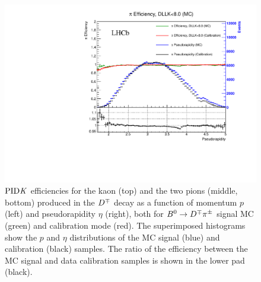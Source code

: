\begin{figure}[t]
\begin{center}
    \includegraphics[width=0.495\linewidth]{AA-Appdx-pid/figs/Bd2DPi_Pi2fromD_DLLKlt8_PIDeff_beforeResampling_ETA.pdf}
  \end{center}
  \vspace{-2mm}
  \caption{$\rm{PID}\it{K}$ efficiencies for the kaon (top) and the two pions (middle, bottom) produced in the $D^\mp$ decay as a function of momentum $p$
	(left) and pseudorapidity $\eta$ (right), both for $B^0\rightarrow D^\mp\pi^\pm$ signal MC (green) and calibration mode (red).
	 The superimposed histograms show the $p$ and $\eta$ distributions of the MC signal (blue) and calibration (black) samples.
	The ratio of the
	efficiency between the MC signal and data calibration
	samples is shown in the lower pad (black).}
  \label{fig:PIDKeffBac}
\end{figure}
